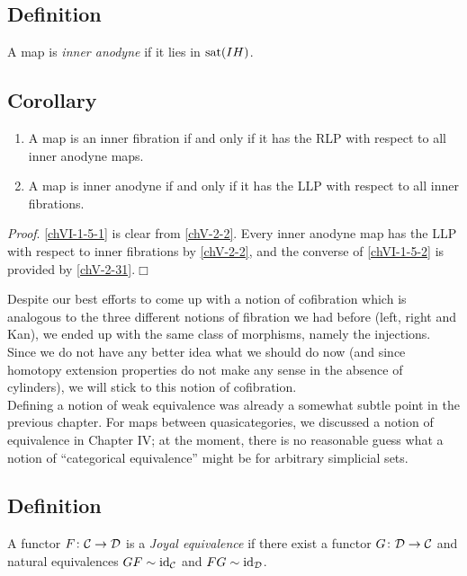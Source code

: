     \subsection{Definition}\label{chVI-1-4}
        A map is \emph{inner anodyne} if it lies in $\operatorname{sat}(I H)$.

    \subsection{Corollary}\label{chVI-1-5}
        \begin{enumerate}[label=\roman*)]
            \item 
                A map is an inner fibration if and only if it has the RLP with respect to all inner anodyne maps.\label{chVI-1-5-1}
            \item 
                A map is inner anodyne if and only if it has the LLP with respect to all inner fibrations.\label{chVI-1-5-2}
        \end{enumerate}
        \smallskip

        \emph{Proof}. \ref{chVI-1-5-1} is clear from \ref{chV-2-2}. Every inner anodyne map has the LLP with respect to inner fibrations by \ref{chV-2-2}, and the converse of \ref{chVI-1-5-2} is provided by \ref{chV-2-31}.\hfill$\Box$
        \medskip

        Despite our best efforts to come up with a notion of cofibration which is analogous to the three different notions of fibration we had before (left, right and Kan), we ended up with the same class of morphisms, namely the injections. Since we do not have any better idea what we should do now (and since homotopy extension properties do not make any sense in the absence of cylinders), we will stick to this notion of cofibration.\\
        Defining a notion of weak equivalence was already a somewhat subtle point in the previous chapter. For maps between quasicategories, we discussed a notion of equivalence in Chapter IV; at the moment, there is no reasonable guess what a notion of “categorical equivalence” might be for arbitrary simplicial sets.

    \subsection{Definition}\label{chVI-1-6}
        A functor $F \colon \mathcal{C} \to \mathcal{D}$ is a \emph{Joyal equivalence} if there exist a functor $G \colon \mathcal{D} \to \mathcal{C}$ and natural equivalences $GF \sim \operatorname{id}_{\mathcal{C}}$ and $FG \sim \operatorname{id}_{\mathcal{D}}$.

